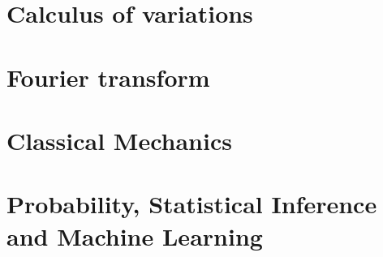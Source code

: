 \documentclass{book}
\begin{document}
\chapter{Calculus of variations}


\chapter{Fourier transform}


\chapter{Classical Mechanics}







% 

\chapter{Probability, Statistical Inference and Machine Learning}



\end{document}
